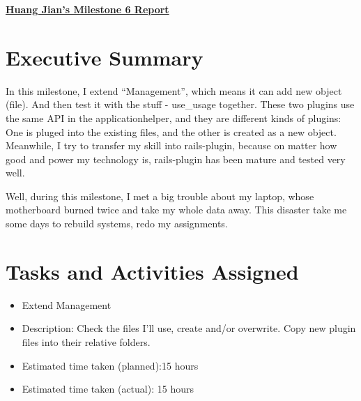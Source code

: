 
\pagestyle{headings}

\begin{center}
{\large\textbf{\underline{{Huang Jian's Milestone 6 Report}}}}
\end{center}

\section*{Executive Summary}
In this milestone, I extend ``Management'', which means it can add new object (file). And then test it with the stuff - use\_usage together. These two plugins use the same API in the applicationhelper, and they are different kinds of plugins: One is pluged into the existing files, and the other is created as a new object. Meanwhile, I try to transfer my skill into rails-plugin, because on matter how good and power my technology is, rails-plugin has been mature and tested very well.

Well, during this milestone, I met a big trouble about my laptop, whose motherboard burned twice and take my whole data away. This disaster take me some days to rebuild systems, redo my assignments.
\section*{Tasks and Activities Assigned}

\begin{itemize}
    \item Extend Management
    \item Description: Check the files I'll use, create and/or overwrite. Copy new plugin files into their relative folders.
    \item Estimated time taken (planned):15 hours
    \item Estimated time taken (actual): 15 hours
\end{itemize}

